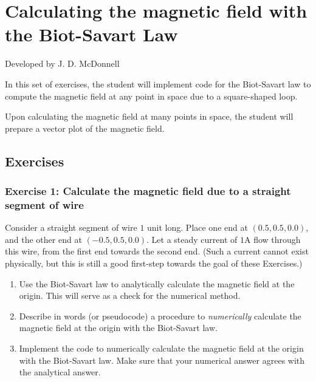 \documentclass[]{article}
\date{}
\providecommand{\tightlist}{%
  \setlength{\itemsep}{0pt}\setlength{\parskip}{0pt}}
\begin{document}
\section{Calculating the magnetic field with the Biot-Savart
Law}\label{calculating-the-magnetic-field-with-the-biot-savart-law}

Developed by J. D. McDonnell

In this set of exercises, the student will implement code for the
Biot-Savart law to compute the magnetic field at any point in space due
to a square-shaped loop.

Upon calculating the magnetic field at many points in space, the student
will prepare a vector plot of the magnetic field.

\subsection{Exercises}\label{exercises}

\subsubsection{Exercise 1: Calculate the magnetic field due to a
straight segment of
wire}\label{exercise-1-calculate-the-magnetic-field-due-to-a-straight-segment-of-wire}

Consider a straight segment of wire \(1\) unit long. Place one end at
\((0.5, 0.5, 0.0)\), and the other end at \((-0.5, 0.5, 0.0)\). Let a
steady current of \(1\)A flow through this wire, from the first end
towards the second end. (Such a current cannot exist physically, but
this is still a good first-step towards the goal of these Exercises.)

\begin{enumerate}
\def\labelenumi{\arabic{enumi}.}
\tightlist
\item
  Use the Biot-Savart law to analytically calculate the magnetic field
  at the origin. This will serve as a check for the numerical method.\\
\item
  Describe in words (or pseudocode) a procedure to \emph{numerically}
  calculate the magnetic field at the origin with the Biot-Savart law.\\
\item
  Implement the code to numerically calculate the magnetic field at the
  origin with the Biot-Savart law. Make sure that your numerical answer
  agrees with the analytical answer.
\end{enumerate}
\end{document}
